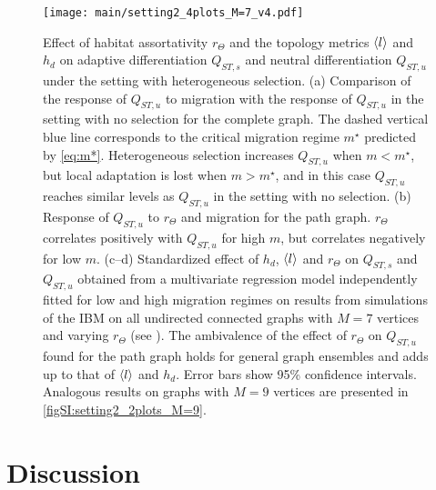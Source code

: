   \begin{figure}[ht] 
	  \centering
		\texttt{[image: main/setting2\_4plots\_M=7\_v4.pdf]}
	  \caption{ \small Effect of habitat assortativity $r_\Theta$ and the topology metrics $\langle l \rangle$ and $h_d$ on adaptive differentiation $Q_{ST,s}$ and neutral differentiation $Q_{ST,u}$ under the setting with heterogeneous selection.
	  (a) Comparison of the response of $Q_{ST,u}$ to migration with the response of $Q_{ST,u}$ in the setting with no selection for the complete graph. The dashed vertical blue line corresponds to the critical migration regime $m^\star$ predicted by \cref{eq:m*}. Heterogeneous selection increases $Q_{ST,u}$ when $m < m^\star$, but local adaptation is lost when $m > m^\star$, and in this case $Q_{ST,u}$ reaches similar levels as $Q_{ST,u}$ in the setting with no selection. 
	  (b) Response of $Q_{ST,u}$ to $r_\Theta$ and migration for the path graph. $r_\Theta$ correlates positively with $Q_{ST,u}$ for high $m$, but correlates negatively for low $m$.
	  (c--d) Standardized effect of $h_d$, $\langle l \rangle$ and $r_\Theta$ on $Q_{ST,s}$ and $Q_{ST,u}$ obtained from a multivariate regression model independently fitted for low and high migration regimes on results from simulations of the IBM on all undirected connected graphs with $M=7$ vertices and varying $r_\Theta$ (see ).
	  The ambivalence of the effect of $r_\Theta$ on $Q_{ST,u}$ found for the path graph holds for general graph ensembles and adds up to that of $\langle l \rangle$ and $h_d$.
	  Error bars show 95\% confidence intervals.
	  Analogous results on graphs with $M=9$ vertices are presented in \cref{figSI:setting2_2plots_M=9}.
	  }
	  \label{fig:setting2_4plots_M=7}
  \end{figure}
  
  \clearpage
  
  \section{Discussion}
  

